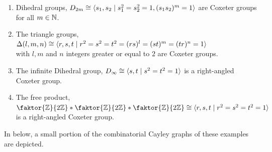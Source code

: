 \begin{example}
    \begin{enumerate}\label{ex:freeprod}
        \item Dihedral groups, \(D_{2m} \cong \langle s_1, s_2\;\vert\;s_1^2 = s_2^2 = 1, (s_1s_2)^m = 1\rangle\) are Coxeter groups for all \(m\in\mathbb{N}\).
        \item The triangle groups, \(\Delta(l,m,n) \cong \langle r,s,t\;\vert\;r^2 = s^2 = t^2 = (rs)^l = (st)^m = (tr)^n = 1\rangle\) \\
              with \(l, m\) and \(n\) integers greater or equal to \(2\) are Coxeter groups.
        \item The infinite Dihedral group, \(D_\infty \cong \langle s,t\;\vert\;s^2=t^2=1\rangle\) is a right-angled Coxeter group.
        \item The free product, \(\faktor{\Z}{2\Z}\ast\faktor{\Z}{2\Z}\ast\faktor{\Z}{2\Z} \cong \groupp{r,s,t}{r^2=s^2=t^2=1}\) is a right-angled Coxeter group.
    \end{enumerate}
\end{example}

In  below, a small portion of the combinatorial Cayley graphs of these examples are depicted.
\newpage

